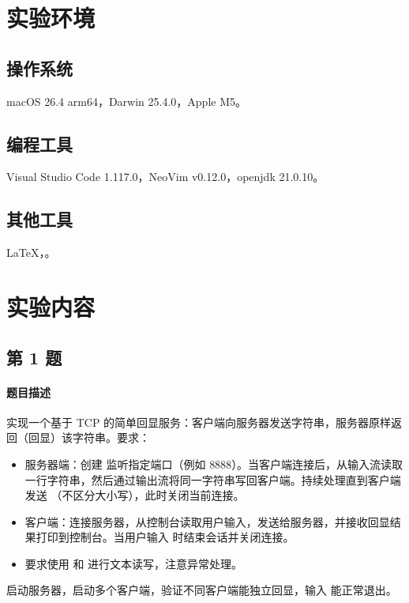 \documentclass{academics}
\begin{document}
\makeacademicscover

\section{实验环境}

\subsection{操作系统}

macOS 26.4 arm64，Darwin 25.4.0，Apple M5。

\subsection{编程工具}

Visual Studio Code 1.117.0，NeoVim v0.12.0，openjdk 21.0.10。

\subsection{其他工具}

\LaTeX{}，。

\section{实验内容}

\subsection{第 1 题}

\paragraph{题目描述} {
    实现一个基于 TCP 的简单回显服务：客户端向服务器发送字符串，服务器原样返回（回显）该字符串。要求：
    \begin{itemize}
        \item 服务器端：创建  监听指定端口（例如 $8888$）。当客户端连接后，从输入流读取一行字符串，然后通过输出流将同一字符串写回客户端。持续处理直到客户端发送 （不区分大小写），此时关闭当前连接。
        \item 客户端：连接服务器，从控制台读取用户输入，发送给服务器，并接收回显结果打印到控制台。当用户输入  时结束会话并关闭连接。
        \item 要求使用  和  进行文本读写，注意异常处理。
    \end{itemize}
    启动服务器，启动多个客户端，验证不同客户端能独立回显，输入  能正常退出。
}
\end{document}
